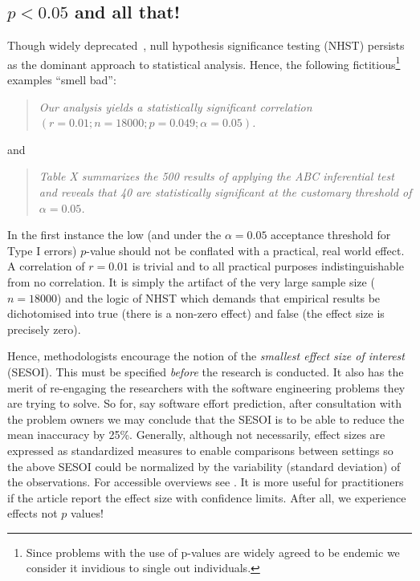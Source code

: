 \documentclass[preprint,10pt]{elsarticle}
\begin{document}
\subsection{$p<0.05$ and all that!}

Though widely deprecated~\cite{carver93,Simm11,Colq14},
 null hypothesis significance testing (NHST) persists as the dominant approach to statistical analysis. Hence, the following fictitious\footnote{Since problems with the use of p-values are widely agreed to be endemic \cite{Simm11,Jorg16} we consider it invidious to single out individuals.} examples ``smell bad'':
\begin{quote}
    {\em Our analysis yields a statistically significant correlation $(r = 0.01;n = 18000;p = 0.049;\alpha = 0.05)$.}
\end{quote}

\noindent
and

\begin{quote}
    {\em Table X summarizes the 500 results of applying the ABC inferential test and reveals that 40 are statistically significant at the customary threshold of $\alpha=0.05$.}
\end{quote}

\noindent
In the first instance the low (and under the $\alpha=0.05$ acceptance threshold for Type I errors)  $p$-value should not be conflated with a practical, real world effect.   A correlation of $r=0.01$ is trivial and to all practical purposes indistinguishable from no correlation.  It is simply the artifact of the very large sample size ($n=18000$) and the logic of NHST which demands that empirical results be dichotomised into true (there is a non-zero effect) and false (the effect size is precisely zero).  

Hence, methodologists encourage the notion of the {\em smallest effect size of interest} (SESOI).  This must be specified \textit{before} the research is conducted.  It also has the merit of re-engaging the researchers with the software engineering problems they are trying to solve.  So for, say software effort prediction, after consultation with the problem owners we may conclude that the SESOI is to be able to reduce the mean inaccuracy by 25\%. Generally, although not necessarily, effect sizes are expressed as standardized measures to enable comparisons between settings so the above SESOI could be normalized by the variability (standard deviation) of the observations. For accessible overviews see \cite{Elli10,Cohe92}.   It is more useful for practitioners if the article report the effect size with confidence limits.  After all, we experience effects not $p$ values!
 
\end{document}
